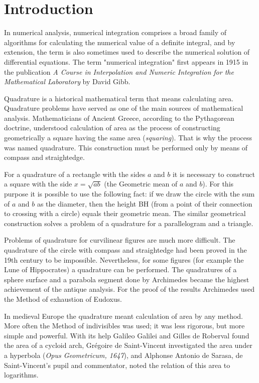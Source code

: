 \documentclass[preprint,12pt]{elsarticle}
\begin{document}

\section{Introduction}
\label{S:1}

In numerical analysis, numerical integration comprises a broad family of algorithms for calculating the numerical value of a definite integral, and by extension, the term is also sometimes used to describe the numerical solution of differential equations. The term "numerical integration" first appears in 1915 in the publication \textit{A Course in Interpolation and Numeric Integration for the Mathematical Laboratory} by David Gibb.

Quadrature is a historical mathematical term that means calculating area. Quadrature problems have served as one of the main sources of mathematical analysis. Mathematicians of Ancient Greece, according to the Pythagorean doctrine, understood calculation of area as the process of constructing geometrically a square having the same area (\textit{squaring}). That is why the process was named quadrature. This construction must be performed only by means of compass and straightedge.

For a quadrature of a rectangle with the sides $a$ and $b$ it is necessary to construct a square with the side $x=\sqrt{ab}$ (the Geometric mean of $a$ and $b$). For this purpose it is possible to use the following fact: if we draw the circle with the sum of $a$ and $b$ as the diameter, then the height BH (from a point of their connection to crossing with a circle) equals their geometric mean. The similar geometrical construction solves a problem of a quadrature for a parallelogram and a triangle.

Problems of quadrature for curvilinear figures are much more difficult. The quadrature of the circle with compass and straightedge had been proved in the 19th century to be impossible. Nevertheless, for some figures (for example the Lune of Hippocrates) a quadrature can be performed. The quadratures of a sphere surface and a parabola segment done by Archimedes became the highest achievement of the antique analysis. For the proof of the results Archimedes used the Method of exhaustion of Eudoxus.

In medieval Europe the quadrature meant calculation of area by any method. More often the Method of indivisibles was used; it was less rigorous, but more simple and powerful. With its help Galileo Galilei and Gilles de Roberval found the area of a cycloid arch, Grégoire de Saint-Vincent investigated the area under a hyperbola (\textit{Opus Geometricum, 1647}), and Alphonse Antonio de Sarasa, de Saint-Vincent's pupil and commentator, noted the relation of this area to logarithms.
\end{document}
